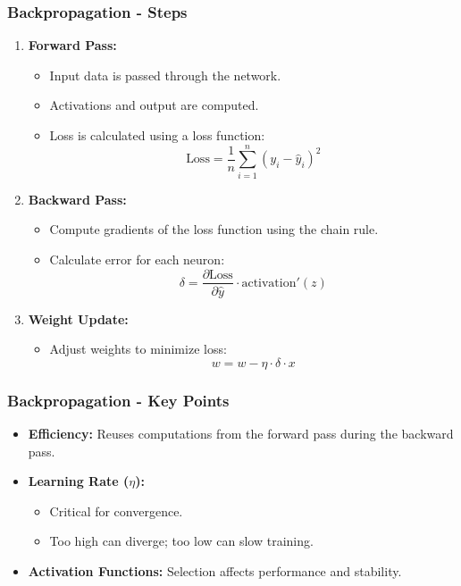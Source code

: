 \documentclass[aspectratio=169]{beamer}
\begin{document}
\begin{frame}[fragile]
    \frametitle{Backpropagation - Steps}
    \begin{enumerate}
        \item \textbf{Forward Pass:}
        \begin{itemize}
            \item Input data is passed through the network.
            \item Activations and output are computed.
            \item Loss is calculated using a loss function:
            \begin{equation}
                \text{Loss} = \frac{1}{n} \sum_{i=1}^{n} (y_i - \hat{y}_i)^2
            \end{equation}
        \end{itemize}

        \item \textbf{Backward Pass:}
        \begin{itemize}
            \item Compute gradients of the loss function using the chain rule.
            \item Calculate error for each neuron:
            \begin{equation}
                \delta = \frac{\partial \text{Loss}}{\partial \hat{y}} \cdot \text{activation}'(z)
            \end{equation}
        \end{itemize}

        \item \textbf{Weight Update:}
        \begin{itemize}
            \item Adjust weights to minimize loss:
            \begin{equation}
                w = w - \eta \cdot \delta \cdot x
            \end{equation}
        \end{itemize}
    \end{enumerate}
\end{frame}

\begin{frame}[fragile]
    \frametitle{Backpropagation - Key Points}
    \begin{itemize}
        \item \textbf{Efficiency:} Reuses computations from the forward pass during the backward pass.
        \item \textbf{Learning Rate ($\eta$):} 
        \begin{itemize}
            \item Critical for convergence.
            \item Too high can diverge; too low can slow training.
        \end{itemize}
        \item \textbf{Activation Functions:} Selection affects performance and stability.
    \end{itemize}
\end{frame}
\end{document}
